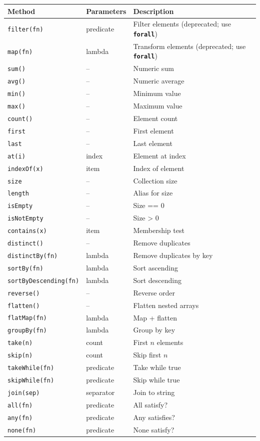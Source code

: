 \documentclass[11pt,a4paper]{article}
\newcommand{\kw}[1]{\texttt{\textbf{#1}}}
\begin{document}
\begin{longtable}{@{}lll@{}}
\toprule
\textbf{Method} & \textbf{Parameters} & \textbf{Description} \\
\midrule
\endhead
\texttt{filter(fn)} & predicate & Filter elements (deprecated; use \kw{forall}) \\
\texttt{map(fn)} & lambda & Transform elements (deprecated; use \kw{forall}) \\
\texttt{sum()} & -- & Numeric sum \\
\texttt{avg()} & -- & Numeric average \\
\texttt{min()} & -- & Minimum value \\
\texttt{max()} & -- & Maximum value \\
\texttt{count()} & -- & Element count \\
\texttt{first} & -- & First element \\
\texttt{last} & -- & Last element \\
\texttt{at(i)} & index & Element at index \\
\texttt{indexOf(x)} & item & Index of element \\
\texttt{size} & -- & Collection size \\
\texttt{length} & -- & Alias for size \\
\texttt{isEmpty} & -- & Size == 0 \\
\texttt{isNotEmpty} & -- & Size > 0 \\
\texttt{contains(x)} & item & Membership test \\
\texttt{distinct()} & -- & Remove duplicates \\
\texttt{distinctBy(fn)} & lambda & Remove duplicates by key \\
\texttt{sortBy(fn)} & lambda & Sort ascending \\
\texttt{sortByDescending(fn)} & lambda & Sort descending \\
\texttt{reverse()} & -- & Reverse order \\
\texttt{flatten()} & -- & Flatten nested arrays \\
\texttt{flatMap(fn)} & lambda & Map + flatten \\
\texttt{groupBy(fn)} & lambda & Group by key \\
\texttt{take(n)} & count & First $n$ elements \\
\texttt{skip(n)} & count & Skip first $n$ \\
\texttt{takeWhile(fn)} & predicate & Take while true \\
\texttt{skipWhile(fn)} & predicate & Skip while true \\
\texttt{join(sep)} & separator & Join to string \\
\texttt{all(fn)} & predicate & All satisfy? \\
\texttt{any(fn)} & predicate & Any satisfies? \\
\texttt{none(fn)} & predicate & None satisfy? \\
\bottomrule
\end{longtable}
\end{document}
